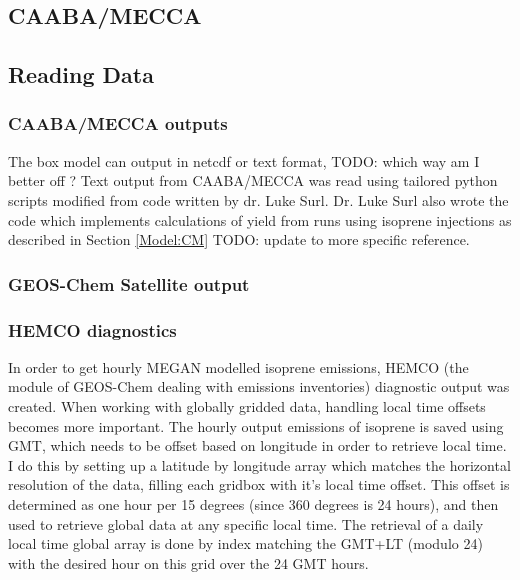   \subsection{CAABA/MECCA}
  
  \subsection{Reading Data}
    \subsubsection{CAABA/MECCA outputs}
      The box model can output in netcdf or text format, TODO: which way am I better off ? 
      Text output from CAABA/MECCA was read using tailored python scripts modified from code written by dr. Luke Surl.
      Dr. Luke Surl also wrote the code which implements calculations of yield from runs using isoprene injections as described in Section \ref{Model:CM} TODO: update to more specific reference.
      
    \subsubsection{GEOS-Chem Satellite output}
    
    \subsubsection{HEMCO diagnostics}
      
      In order to get hourly MEGAN modelled isoprene emissions, HEMCO (the module of GEOS-Chem dealing with emissions inventories) diagnostic output was created.
      When working with globally gridded data, handling local time offsets becomes more important.
      The hourly output emissions of isoprene is saved using GMT, which needs to be offset based on longitude in order to retrieve local time.
      I do this by setting up a latitude by longitude array which matches the horizontal resolution of the data, filling each gridbox with it's local time offset.
      This offset is determined as one hour per 15 degrees (since 360 degrees is 24 hours), and then used to retrieve global data at any specific local time.
      The retrieval of a daily local time global array is done by index matching the GMT+LT (modulo 24) with the desired hour on this grid over the 24 GMT hours.
    
